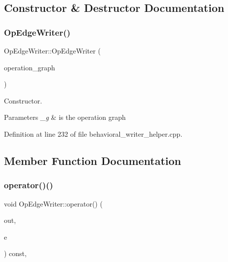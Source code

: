\subsection{Constructor \& Destructor Documentation}
\mbox{\label{classOpEdgeWriter_a22bdd4d332a41fc9be24ef3952c322d1}} 
\subsubsection{\texorpdfstring{Op\+Edge\+Writer()}{OpEdgeWriter()}}
{\footnotesize\ttfamily Op\+Edge\+Writer\+::\+Op\+Edge\+Writer (\begin{DoxyParamCaption}\item[{const \hyperlink{structOpGraph}{Op\+Graph} $\ast$}]{operation\+\_\+graph }\end{DoxyParamCaption})\hspace{0.3cm}{\ttfamily [explicit]}}



Constructor. 


\begin{DoxyParams}{Parameters}
{\em \+\_\+g} & is the operation graph \\
\hline
\end{DoxyParams}


Definition at line 232 of file behavioral\+\_\+writer\+\_\+helper.\+cpp.



\subsection{Member Function Documentation}
\mbox{\label{classOpEdgeWriter_af4383267715e988b7eaa5468ad6023fb}} 
\subsubsection{\texorpdfstring{operator()()}{operator()()}}
{\footnotesize\ttfamily void Op\+Edge\+Writer\+::operator() (\begin{DoxyParamCaption}\item[{std\+::ostream \&}]{out,  }\item[{const \hyperlink{graph_8hpp_a9eb9afea34e09f484b21f2efd263dd48}{Edge\+Descriptor} \&}]{e }\end{DoxyParamCaption}) const\hspace{0.3cm}{\ttfamily [override]}, {\ttfamily [virtual]}}



